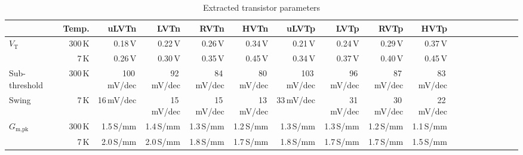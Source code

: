 \documentclass[journal]{IEEEtran}
\newcommand{\CR}[1]{{\color{black}#1}}
\begin{document}
\begin{table}[bt!]\begin{center}
\caption{Extracted transistor parameters}\label{transistors}
\begin{tabular}{lrrrrrrrrrrrrrrrrr}
\toprule
&Temp.&uLVTn&LVTn&RVTn&HVTn&uLVTp&LVTp&RVTp&HVTp\\
\midrule
$V_\text{T}$&300\,K&0.18\,V&0.22\,V&0.26\,V&0.34\,V&0.21\,V&0.24\,V&0.29\,V&0.37\,V\\
&7\,K&0.26\,V&0.30\,V&0.35\,V&0.45\,V&0.34\,V&0.37\,V&0.40\,V&0.45\,V\\
\midrule
Sub-threshold&300\,K&\CR{100}\,mV/dec&\CR{92}\,mV/dec&\CR{84}\,mV/dec&\CR{80}\,mV/dec&\CR{103}\,mV/dec&\CR{96}\,mV/dec&\CR{87}\,mV/dec&\CR{83}\,mV/dec\\
\CR{Swing} &7\,K&\CR{16}\,mV/dec&\CR{15}\,mV/dec&\CR{15}\,mV/dec&\CR{13}\,mV/dec&\CR{33}\,mV/dec&\CR{31}\,mV/dec&\CR{30}\,mV/dec&\CR{22}\,mV/dec\\
\midrule
$G_\text{m,pk}$&300\,K&1.5\,S/mm&1.4\,S/mm&1.3\,S/mm&1.2\,S/mm&1.3\,S/mm&1.3\,S/mm&1.2\,S/mm&1.1\,S/mm\\
&7\,K&2.0\,S/mm&2.0\,S/mm&1.8\,S/mm&1.7\,S/mm&1.8\,S/mm&1.7\,S/mm&1.7\,S/mm&1.5\,S/mm\\
\midrule


\end{tabular}
\end{center}
\end{table}
\end{document}
